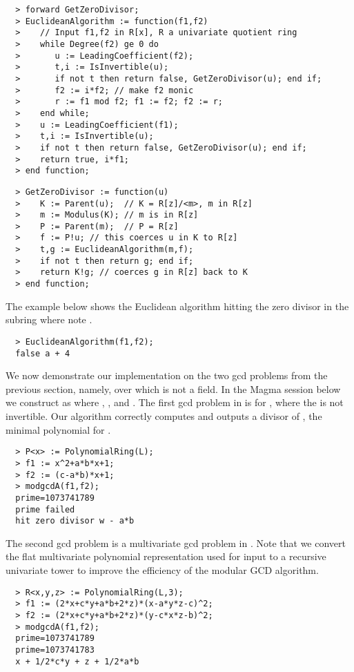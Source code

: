 \documentclass[10pt]{article}
\begin{document}
{ \small
\begin{verbatim}
  > forward GetZeroDivisor;
  > EuclideanAlgorithm := function(f1,f2)
  >    // Input f1,f2 in R[x], R a univariate quotient ring
  >    while Degree(f2) ge 0 do
  >       u := LeadingCoefficient(f2);
  >       t,i := IsInvertible(u);
  >       if not t then return false, GetZeroDivisor(u); end if;
  >       f2 := i*f2; // make f2 monic
  >       r := f1 mod f2; f1 := f2; f2 := r;
  >    end while;
  >    u := LeadingCoefficient(f1);
  >    t,i := IsInvertible(u);
  >    if not t then return false, GetZeroDivisor(u); end if;
  >    return true, i*f1;
  > end function;
\end{verbatim}
\begin{verbatim}
  > GetZeroDivisor := function(u)
  >    K := Parent(u);  // K = R[z]/<m>, m in R[z]
  >    m := Modulus(K); // m is in R[z]
  >    P := Parent(m);  // P = R[z]
  >    f := P!u; // this coerces u in K to R[z]
  >    t,g := EuclideanAlgorithm(m,f);
  >    if not t then return g; end if;
  >    return K!g; // coerces g in R[z] back to K
  > end function;
\end{verbatim}
}


\noindent
The example below shows the Euclidean algorithm hitting
the zero divisor  in the subring 
where note .

{ \small
\begin{verbatim}
  > EuclideanAlgorithm(f1,f2);
  false a + 4
\end{verbatim}
}

\noindent
We now demonstrate our implementation on the two gcd problems
from the previous section, namely, over  which
is not a field.  In the Magma session below we construct 
as  where , , and .
The first gcd problem in  is for , 
where the  is not invertible.
Our algorithm correctly computes and outputs  a divisor
of , the minimal polynomial for .

{ \small
\begin{verbatim}
  > P<x> := PolynomialRing(L);
  > f1 := x^2+a*b*x+1;
  > f2 := (c-a*b)*x+1;
  > modgcdA(f1,f2);
  prime=1073741789
  prime failed
  hit zero divisor w - a*b
\end{verbatim}
}

\noindent
The second gcd problem is a multivariate gcd problem in .
Note that we convert the flat multivariate polynomial representation used for input
to a recursive univariate tower  to improve
the efficiency of the modular GCD algorithm.

{ \small
\begin{verbatim}
  > R<x,y,z> := PolynomialRing(L,3);
  > f1 := (2*x+c*y+a*b+2*z)*(x-a*y*z-c)^2;
  > f2 := (2*x+c*y+a*b+2*z)*(y-c*x*z-b)^2;
  > modgcdA(f1,f2);
  prime=1073741789
  prime=1073741783
  x + 1/2*c*y + z + 1/2*a*b
\end{verbatim}
}
\end{document}

